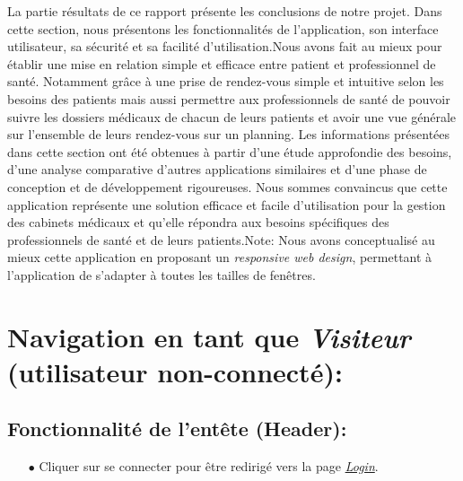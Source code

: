 \documentclass[a4paper]{report}
\begin{document}
La partie résultats de ce rapport présente les conclusions de notre projet. Dans cette section, nous présentons les fonctionnalités de l’application, son interface utilisateur, sa sécurité et sa facilité d’utilisation.Nous avons fait au mieux pour établir une mise en relation simple et efficace entre patient et professionnel de santé. Notamment grâce à une prise de rendez-vous simple et intuitive selon les besoins des patients mais aussi permettre aux professionnels de santé de pouvoir suivre les dossiers médicaux de chacun de leurs patients et avoir une vue générale sur l’ensemble de leurs rendez-vous sur un planning. Les informations présentées dans cette section ont été obtenues à partir d’une étude approfondie des besoins, d’une analyse comparative d’autres applications similaires et d’une phase de conception et de développement rigoureuses. Nous sommes convaincus que cette application représente une solution efficace et facile d’utilisation pour la gestion des cabinets médicaux et qu’elle répondra aux besoins spécifiques des professionnels de santé et de leurs patients.{\fontsize{8}{14}\selectfont Note: Nous avons conceptualisé au mieux cette application en proposant un \textit{responsive web design}, permettant à l'application de s'adapter à toutes les tailles de fenêtres}.
\newline
\newline

\section{\noindent Navigation en tant que \textit{Visiteur} {\fontsize{12}{16}\selectfont(utilisateur non-connecté)}: }

\subsection{Fonctionnalité de l'entête (Header):}
    \begin{itemize} 
        \item[$\bullet$] Cliquer sur se connecter pour être redirigé vers la page \textit{\hyperref[login]{Login}}.
    \end{itemize}
    \vspace{3mm}
\end{document}
